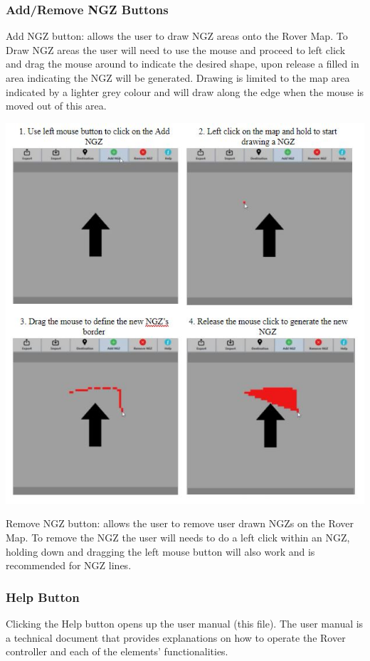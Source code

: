 \documentclass[12pt]{article}
\begin{document}
	\subsubsection{Add/Remove NGZ Buttons}
Add NGZ button: allows the user to draw NGZ areas onto the Rover Map. To Draw NGZ areas the user will need to use the mouse and proceed to left click and drag the mouse around to indicate the desired shape, upon release a filled in area indicating the NGZ will be generated. Drawing is limited to the map area indicated by a lighter grey colour and will draw along the edge when the mouse is moved out of this area.
		\begin{center}
		\includegraphics[scale=1.1]{AddNGZ.jpg}
		\end{center}
Remove NGZ button: allows the user to remove user drawn NGZs on the Rover Map. To remove the NGZ the user will needs to do a left click within an NGZ, holding down and dragging the left mouse button will also work and is recommended for NGZ lines. 
	
	\subsubsection{Help Button}
Clicking the Help button opens up the user manual (this file). The user manual is a technical document that provides explanations on how to operate the Rover controller and each of the elements’ functionalities.
		
\end{document}
